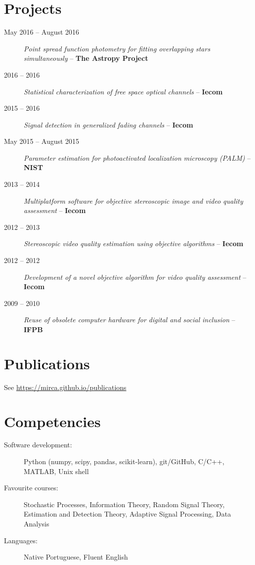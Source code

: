\documentclass[10pt]{article}
\begin{document}
\begin{titlepage}
\section{Projects}
\begin{description}
\item[May 2016 -- August 2016] \emph{Point spread function photometry for fitting overlapping stars simultaneously} -- \textbf{The Astropy Project}
\item[2016 -- 2016] \emph{Statistical characterization of free space optical channels} -- \textbf{Iecom}
\item[2015 -- 2016] \emph{Signal detection in generalized fading channels} -- \textbf{Iecom}
\item[May 2015 -- August 2015] \emph{Parameter estimation for photoactivated localization microscopy (PALM)} -- \textbf{NIST}
\item[2013 -- 2014] \emph{Multiplatform software for objective stereoscopic image and video quality assessment} -- \textbf{Iecom}
\item[2012 -- 2013] \emph{Stereoscopic video quality estimation using objective algorithms} -- \textbf{Iecom}
\item[2012 -- 2012] \emph{Development of a novel objective algorithm for video quality assessment} -- \textbf{Iecom}
\item[2009 -- 2010] \emph{Reuse of obsolete computer hardware for digital and social inclusion} -- \textbf{IFPB}
\end{description}

\section{Publications}
See \url{https://mirca.github.io/publications}

\section{Competencies}
\begin{description}
    \item[Software development:] Python (numpy, scipy, pandas, scikit-learn), git/GitHub, C/C++, MATLAB, Unix shell
    \item[Favourite courses:] Stochastic Processes, Information Theory, Random Signal Theory, Estimation and Detection Theory, Adaptive Signal Processing, Data Analysis
    \item[Languages:] Native Portuguese, Fluent English
\end{description}


\end{titlepage}
\end{document}
